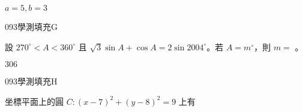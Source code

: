 \begin{QUESTIONS}
\begin{QUESTION}
\begin{QBODY}
        \end{QBODY}
        \begin{QFROMS}
        \end{QFROMS}
        \begin{QTAGS}\end{QTAGS}
        \begin{QANS}
            $a=5, b=3$
        \end{QANS}
        \begin{QSOLLIST}
        \end{QSOLLIST}
        \begin{QEMPTYSPACE}
        \end{QEMPTYSPACE}
    \end{QUESTION}
    \begin{QUESTION}
        \begin{ExamInfo}{093}{學測}{填充}{G}
        \end{ExamInfo}
        \begin{ExamAnsRateInfo}{10}{27}{3}{0}
        \end{ExamAnsRateInfo}
        \begin{QBODY}
            設 $270^\circ <A< 360^\circ$ 且 $\sqrt{3}\sin A+ \cos A=2 \sin {2004} ^\circ$。若 $A=m^\circ$，則 $m=$
            \TCNBOX{\TCN\TCN\TCN}。
        \end{QBODY}
        \begin{QFROMS}
        \end{QFROMS}
        \begin{QTAGS}\end{QTAGS}
        \begin{QANS}
            $306$
        \end{QANS}
        \begin{QSOLLIST}
        \end{QSOLLIST}
        \begin{QEMPTYSPACE}
        \end{QEMPTYSPACE}
    \end{QUESTION}
    \begin{QUESTION}
        \begin{ExamInfo}{093}{學測}{填充}{H}
        \end{ExamInfo}
        \begin{ExamAnsRateInfo}{21}{37}{18}{8}
        \end{ExamAnsRateInfo}
        \begin{QBODY}
            坐標平面上的圓 $C:(x-7)^2+(y-8)^2=9$ 上有 

\end{QBODY}
\end{QUESTION}
\end{QUESTIONS}
